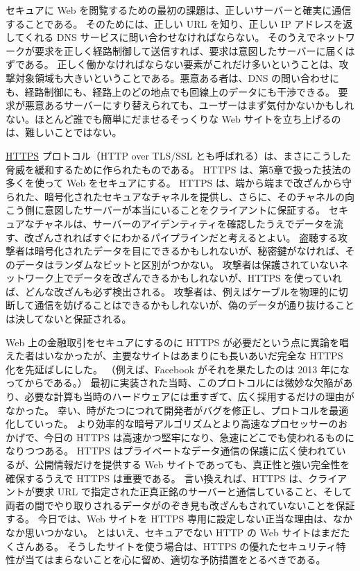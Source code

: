 \documentclass[uplatex]{jsarticle}
\begin{document}
セキュアに Web を閲覧するための最初の課題は、正しいサーバーと確実に通信することである。
そのためには、正しい URL を知り、正しい IP アドレスを返してくれる DNS サービスに問い合わせなければならない。
そのうえでネットワークが要求を正しく経路制御して送信すれば、要求は意図したサーバーに届くはずである。
正しく働かなければならない要素がこれだけ多いということは、攻撃対象領域も大きいということである。悪意ある者は、DNS の問い合わせにも、経路制御にも、経路上のどの地点でも回線上のデータにも干渉できる。
要求が悪意あるサーバーにすり替えられても、ユーザーはまず気付かないかもしれない。ほとんど誰でも簡単にだませるそっくりな Web サイトを立ち上げるのは、難しいことではない。

\underline{HTTPS} プロトコル（HTTP over TLS/SSL とも呼ばれる）は、まさにこうした脅威を緩和するために作られたものである。
HTTPS は、第5章で扱った技法の多くを使って Web をセキュアにする。
HTTPS は、端から端まで改ざんから守られた、暗号化されたセキュアなチャネルを提供し、さらに、そのチャネルの向こう側に意図したサーバーが本当にいることをクライアントに保証する。
セキュアなチャネルは、サーバーのアイデンティティを確認したうえでデータを流す、改ざんされればすぐにわかるパイプラインだと考えるとよい。
盗聴する攻撃者は暗号化されたデータを目にできるかもしれないが、秘密鍵がなければ、そのデータはランダムなビットと区別がつかない。
攻撃者は保護されていないネットワーク上でデータを改ざんできるかもしれないが、HTTPS を使っていれば、どんな改ざんも必ず検出される。
攻撃者は、例えばケーブルを物理的に切断して通信を妨げることはできるかもしれないが、偽のデータが通り抜けることは決してないと保証される。

Web 上の金融取引をセキュアにするのに HTTPS が必要だという点に異論を唱えた者はいなかったが、主要なサイトはあまりにも長いあいだ完全な HTTPS 化を先延ばしにした。
（例えば、Facebook がそれを果たしたのは 2013 年になってからである。）
最初に実装された当時、このプロトコルには微妙な欠陥があり、必要な計算も当時のハードウェアには重すぎて、広く採用するだけの理由がなかった。
幸い、時がたつにつれて開発者がバグを修正し、プロトコルを最適化していった。
より効率的な暗号アルゴリズムとより高速なプロセッサーのおかげで、今日の HTTPS は高速かつ堅牢になり、急速にどこでも使われるものになりつつある。
HTTPS はプライベートなデータ通信の保護に広く使われているが、公開情報だけを提供する Web サイトであっても、真正性と強い完全性を確保するうえで HTTPS は重要である。
言い換えれば、HTTPS は、クライアントが要求 URL で指定された正真正銘のサーバーと通信していること、そして両者の間でやり取りされるデータがのぞき見も改ざんもされていないことを保証する。
今日では、Web サイトを HTTPS 専用に設定しない正当な理由は、なかなか思いつかない。
とはいえ、セキュアでない HTTP の Web サイトはまだたくさんある。
そうしたサイトを使う場合は、HTTPS の優れたセキュリティ特性が当てはまらないことを心に留め、適切な予防措置をとるべきである。
\end{document}
